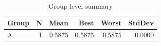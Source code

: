 \begin{table}[htbp]
\centering
\caption{Group-level summary}
\label{tab:group-summary}
\begin{tabular}{lrrrrr}
\toprule
\textbf{Group} & \textbf{N} & \textbf{Mean} & \textbf{Best} & \textbf{Worst} & \textbf{StdDev} \\
\midrule
A & 1 & 0.5875 & 0.5875 & 0.5875 & 0.0000 \\
\bottomrule
\end{tabular}
\end{table}